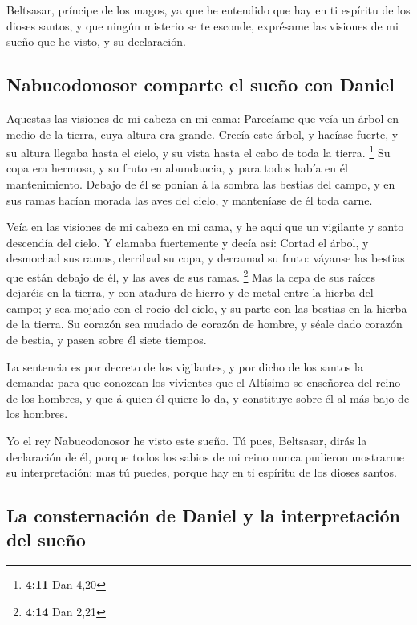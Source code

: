  Beltsasar, príncipe de los magos, ya que he entendido que
hay en ti espíritu de los dioses santos, y que ningún misterio se te
esconde, exprésame las visiones de mi sueño que he visto, y su
declaración.

\hypertarget{nabucodonosor-comparte-el-sueuxf1o-con-daniel}{%
\subsection{Nabucodonosor comparte el sueño con
Daniel}\label{nabucodonosor-comparte-el-sueuxf1o-con-daniel}}

 Aquestas las visiones de mi cabeza en mi cama: Parecíame
que veía un árbol en medio de la tierra, cuya altura era grande.
 Crecía este árbol, y hacíase fuerte, y su altura llegaba
hasta el cielo, y su vista hasta el cabo de toda la tierra. \footnote{\textbf{4:11}
  Dan 4,20}  Su copa era hermosa, y su fruto en
abundancia, y para todos había en él mantenimiento. Debajo de él se
ponían á la sombra las bestias del campo, y en sus ramas hacían morada
las aves del cielo, y manteníase de él toda carne.

 Veía en las visiones de mi cabeza en mi cama, y he aquí
que un vigilante y santo descendía del cielo.  Y clamaba
fuertemente y decía así: Cortad el árbol, y desmochad sus ramas,
derribad su copa, y derramad su fruto: váyanse las bestias que están
debajo de él, y las aves de sus ramas. \footnote{\textbf{4:14} Dan 2,21}
 Mas la cepa de sus raíces dejaréis en la tierra, y con
atadura de hierro y de metal entre la hierba del campo; y sea mojado con
el rocío del cielo, y su parte con las bestias en la hierba de la
tierra.  Su corazón sea mudado de corazón de hombre, y
séale dado corazón de bestia, y pasen sobre él siete tiempos.

 La sentencia es por decreto de los vigilantes, y por
dicho de los santos la demanda: para que conozcan los vivientes que el
Altísimo se enseñorea del reino de los hombres, y que á quien él quiere
lo da, y constituye sobre él al más bajo de los hombres.

 Yo el rey Nabucodonosor he visto este sueño. Tú pues,
Beltsasar, dirás la declaración de él, porque todos los sabios de mi
reino nunca pudieron mostrarme su interpretación: mas tú puedes, porque
hay en ti espíritu de los dioses santos.

\hypertarget{la-consternaciuxf3n-de-daniel-y-la-interpretaciuxf3n-del-sueuxf1o}{%
\subsection{La consternación de Daniel y la interpretación del
sueño}\label{la-consternaciuxf3n-de-daniel-y-la-interpretaciuxf3n-del-sueuxf1o}}

